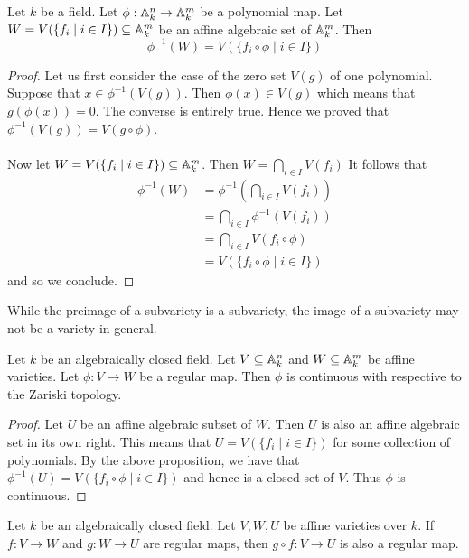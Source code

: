 \documentclass[a4paper]{article}
\begin{document}
\begin{prp}{}{} Let $k$ be a field. Let $\phi:\mathbb{A}_k^n\to\mathbb{A}_k^m$ be a polynomial map. Let $W=V(\{f_i\;|\;i\in I\})\subseteq\mathbb{A}_k^m$ be an affine algebraic set of $\mathbb{A}_k^m$. Then $$\phi^{-1}(W)=V(\{f_i\circ\phi\;|\;i\in I\})$$ \tcbline
\begin{proof}
Let us first consider the case of the zero set $V(g)$ of one polynomial. Suppose that $x\in\phi^{-1}(V(g))$. Then $\phi(x)\in V(g)$ which means that $g(\phi(x))=0$. The converse is entirely true. Hence we proved that $\phi^{-1}(V(g))=V(g\circ\phi)$. \\~\\

Now let $W=V(\{f_i\;|\;i\in I\})\subseteq\mathbb{A}_k^m$. Then $W=\bigcap_{i\in I}V(f_i)$ It follows that 
\begin{align*}
\phi^{-1}(W)&=\phi^{-1}\left(\bigcap_{i\in I}V(f_i)\right)\\
&=\bigcap_{i\in I}\phi^{-1}\left(V(f_i)\right)\\
&=\bigcap_{i\in I}V(f_i\circ\phi)\\
&=V(\{f_i\circ\phi\;|\;i\in I\})
\end{align*}
and so we conclude. 
\end{proof}
\end{prp}

While the preimage of a subvariety is a subvariety, the image of a subvariety may not be a variety in general. 

\begin{thm}{}{} Let $k$ be an algebraically closed field. Let $V\subseteq\mathbb{A}_k^n$ and $W\subseteq\mathbb{A}_k^m$ be affine varieties. Let $\phi:V\to W$ be a regular map. Then $\phi$ is continuous with respective to the Zariski topology. \tcbline
\begin{proof}
Let $U$ be an affine algebraic subset of $W$. Then $U$ is also an affine algebraic set in its own right. This means that $U=V(\{f_i\;|\;i\in I\})$ for some collection of polynomials. By the above proposition, we have that $\phi^{-1}(U)=V(\{f_i\circ\phi\;|\;i\in I\})$ and hence is a closed set of $V$. Thus $\phi$ is continuous. 
\end{proof}
\end{thm}

\begin{prp}{}{} Let $k$ be an algebraically closed field. Let $V,W,U$ be affine varieties over $k$. If $f:V\to W$ and $g:W\to U$ are regular maps, then $g\circ f:V\to U$ is also a regular map. 
\end{prp}
\end{document}

